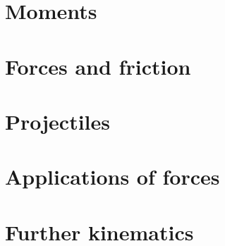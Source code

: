 \chapter{Moments}



\chapter{Forces and friction}


\chapter{Projectiles}


\chapter{Applications of forces}



\chapter{Further kinematics}